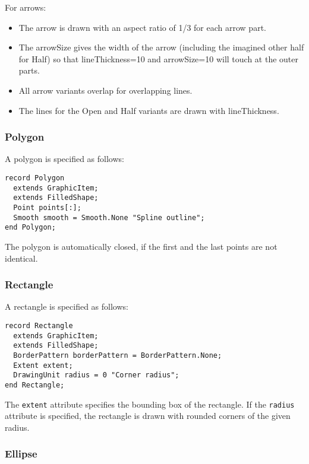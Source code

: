 For arrows:

\begin{itemize}
\item
  The arrow is drawn with an aspect ratio of 1/3 for each arrow part.
\item
  The arrowSize gives the width of the arrow (including the imagined
  other half for Half) so that lineThickness=10 and arrowSize=10 will
  touch at the outer parts.
\item
  All arrow variants overlap for overlapping lines.
\item
  The lines for the Open and Half variants are drawn with lineThickness.
\end{itemize}

\subsubsection{Polygon}

A polygon is specified as follows:

\begin{lstlisting}[language=modelica]
record Polygon
  extends GraphicItem;
  extends FilledShape;
  Point points[:];
  Smooth smooth = Smooth.None "Spline outline";
end Polygon;
\end{lstlisting}
The polygon is automatically closed, if the first and the last points
are not identical.

\subsubsection{Rectangle}

A rectangle is specified as follows:

\begin{lstlisting}[language=modelica]
record Rectangle
  extends GraphicItem;
  extends FilledShape;
  BorderPattern borderPattern = BorderPattern.None;
  Extent extent;
  DrawingUnit radius = 0 "Corner radius";
end Rectangle;
\end{lstlisting}
The \lstinline!extent! attribute specifies the bounding box of the rectangle. If the
\lstinline!radius! attribute is specified, the rectangle is drawn with rounded
corners of the given radius.

\subsubsection{Ellipse}


